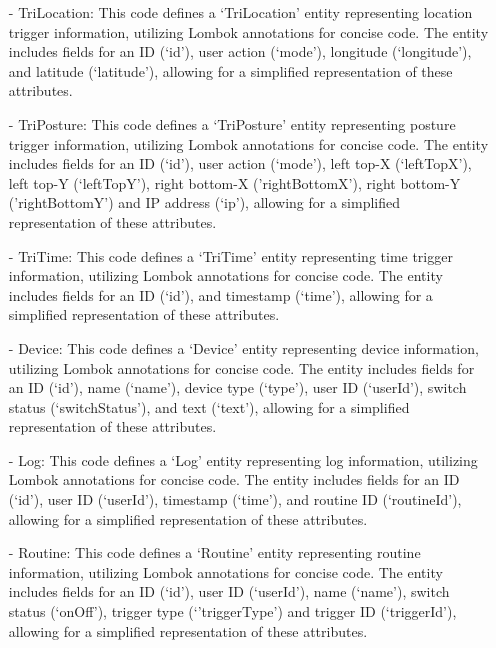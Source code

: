 \begin{enumerate}
                        \item[-] TriLocation: This code defines a ‘TriLocation' entity representing location trigger information, utilizing Lombok annotations for concise code. The entity includes fields for an ID (‘id’), user action (‘mode’), longitude (‘longitude’), and latitude (‘latitude’), allowing for a simplified representation of these attributes.\\
                        \item[-] TriPosture: This code defines a ‘TriPosture' entity representing posture trigger information, utilizing Lombok annotations for concise code. The entity includes fields for an ID (‘id’), user action (‘mode’), left top-X (‘leftTopX’), left top-Y (‘leftTopY’), right bottom-X ('rightBottomX'), right bottom-Y ('rightBottomY') and IP address (‘ip’), allowing for a simplified representation of these attributes. \\
                        \item[-] TriTime: This code defines a ‘TriTime' entity representing time trigger information, utilizing Lombok annotations for concise code. The entity includes fields for an ID (‘id’), and timestamp (‘time’), allowing for a simplified representation of these attributes.\\
                        \item[-] Device: This code defines a ‘Device' entity representing device information, utilizing Lombok annotations for concise code. The entity includes fields for an ID (‘id’), name (‘name’), device type (‘type’), user ID (‘userId’), switch status (‘switchStatus’), and text (‘text’), allowing for a simplified representation of these attributes.\\
                        \item[-] Log: This code defines a ‘Log' entity representing log information, utilizing Lombok annotations for concise code. The entity includes fields for an ID (‘id’), user ID (‘userId’), timestamp (‘time’), and routine ID (‘routineId’), allowing for a simplified representation of these attributes. \\
                        \item[-] Routine: This code defines a ‘Routine' entity representing routine information, utilizing Lombok annotations for concise code. The entity includes fields for an ID (‘id’), user ID (‘userId’), name (‘name’), switch status (‘onOff’), trigger type (‘’triggerType’) and trigger ID (‘triggerId’), allowing for a simplified representation of these attributes.\\

\end{enumerate}
